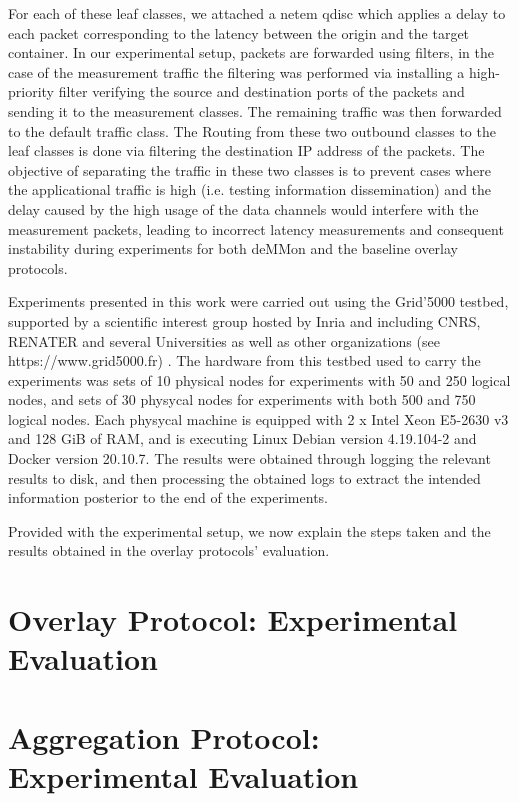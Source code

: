 For each of these leaf classes, we attached a netem qdisc which applies a delay to each packet corresponding to the latency between the origin and the target container. In our experimental setup, packets are forwarded using filters, in the case of the measurement traffic the filtering was performed via installing a high-priority filter verifying the source and destination ports of the packets and sending it to the measurement classes. The remaining traffic was then forwarded to the default traffic class. The Routing from these two outbound classes to the leaf classes is done via filtering the destination IP address of the packets.  The objective of separating the traffic in these two classes is to prevent cases where the applicational traffic is high (i.e. testing information dissemination) and the delay caused by the high usage of the data channels would interfere with the measurement packets, leading to incorrect latency measurements and consequent instability during experiments for both deMMon and the baseline overlay protocols. 

Experiments presented in this work were carried out using the Grid'5000 testbed, supported by a scientific interest group hosted by Inria and including CNRS, RENATER and several Universities as well as other organizations (see https://www.grid5000.fr) . The hardware from this testbed used to carry the experiments was sets of 10 physical nodes for experiments with 50 and 250 logical nodes, and sets of 30 physycal nodes for experiments with both 500 and 750 logical nodes. Each physycal machine is equipped with 2 x Intel Xeon E5-2630 v3 and 128 GiB of RAM, and is executing Linux Debian version 4.19.104-2 and Docker version 20.10.7. The results were obtained through logging the relevant results to disk, and then processing the obtained logs to extract the intended information posterior to the end of the experiments.

Provided with the experimental setup, we now explain the steps taken and the results obtained in the overlay protocols' evaluation.

\section{Overlay Protocol: Experimental Evaluation} \label{sec:overlay_proto_eval} 

\section{Aggregation Protocol: Experimental Evaluation} \label{sec:agg_proto_eval} 

